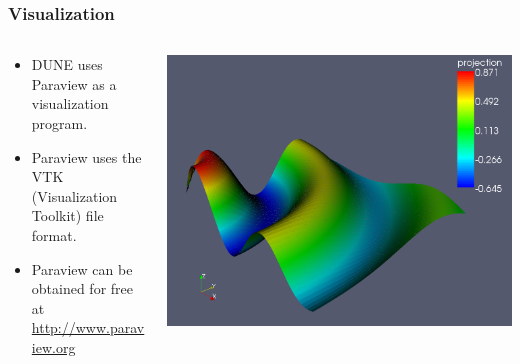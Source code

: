 \documentclass[aspectratio=169,11pt]{beamer}
\theoremstyle{definition}
\begin{document}
\begin{frame}[fragile]
\frametitle{Visualization}

\begin{columns}[b]
\begin{column}{0.5\textwidth}
\begin{itemize}
\item DUNE uses Paraview as a visualization program.
\item Paraview uses the VTK (Visualization Toolkit) file format.
\item Paraview can be obtained for free at \url{http://www.paraview.org}
\end{itemize}
\end{column}
\begin{column}{0.5\textwidth}
\includegraphics[width=\textwidth]{figures/io/visualisation.png}
\end{column}
\end{columns}

\end{frame}

\end{document}
